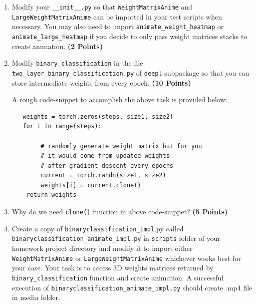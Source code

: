 \documentclass[12pt, xcolor=dvipsnames,svgnames,x11names]{article}
\begin{document}
\begin{enumerate}
\item Modify your  \texttt{__init__.py}  so that \texttt{WeightMatrixAnime} and \texttt{LargeWeightMatrixAnime} can be imported in your test scripts when necessary. You may also need to import  \texttt{animate_weight_heatmap} or \texttt{animate_large_heatmap} if you decide to only pass weight matrices stacks to create animation.  \hfill \textbf{(2 Points)}


\item Modify \texttt{binary_classification} in the file  \texttt{two_layer_binary_classification.py} of \texttt{deepl} subpackage so that you can store intermediate weights from every epoch. \hfill \textbf{(10 Points)}

A rough code-snippet to accomplish the above task is provided below:


\begin{verbatim}
   weights = torch.zeros(steps, size1, size2)
   for i in range(steps):
   
   		# randomly generate weight matrix but for you 
   		# it would come from updated weights 
   		# after gradient descent every epochs
        current = torch.randn(size1, size2)
        weights[i] = current.clone()
    return weights

\end{verbatim}

\item Why do we need \texttt{clone()} function in above code-snippet? \hfill \textbf{(5 Points)}

\item Create a copy of \texttt{binaryclassification\_impl}.py called \texttt{binaryclassification_animate_impl.py} in \texttt{scripts} folder of your homework project directory and modify it to import either \texttt{WeightMatrixAnime} or \texttt{LargeWeightMatrixAnime} whichever works best for your case. Your task is to access 3D weights matrices returned by  \texttt{binary_classification} function and create animation. A successful execution of  \texttt{binaryclassification_animate_impl.py} should create .mp4 file in media folder.


\end{enumerate}
\end{document}
